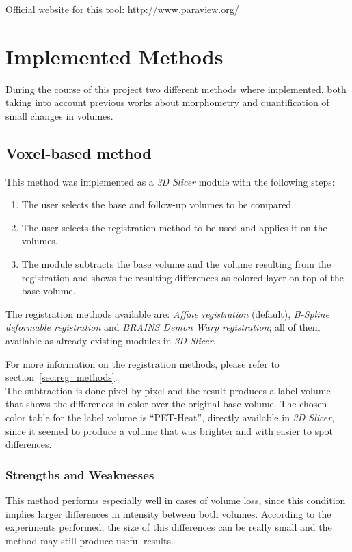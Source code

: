 Official website for this tool: \url{http://www.paraview.org/}

\section{Implemented Methods}
During the course of this project two different methods where
implemented, both taking into account previous works about morphometry
and quantification of small changes in volumes.

\subsection{Voxel-based method}
This method was implemented as a \textit{3D Slicer} module with the following steps:
\begin{enumerate}
\item The user selects the base and follow-up volumes to be compared.
\item The user selects the registration method to be used and applies it on the volumes.
\item The module subtracts the base volume and the volume resulting
  from the registration and shows the resulting differences as colored
  layer on top of the base volume.
\end{enumerate}

The registration methods available are: \textit{Affine registration}
(default), \textit{B-Spline deformable registration} and
\textit{BRAINS Demon Warp registration}; all of them available as
already existing modules in \textit{3D Slicer}.

For more information on the registration methods, please refer to
section~\ref{sec:reg_methods}.\\

The subtraction is done pixel-by-pixel and the result produces a label
volume that shows the differences in color over the original base
volume. The chosen color table for the label volume is ``PET-Heat'',
directly available in \textit{3D Slicer}, since it seemed to produce a
volume that was brighter and with easier to spot differences.

\subsubsection{Strengths and Weaknesses}
This method performs especially well in cases of volume loss, since
this condition implies larger differences in intensity between both
volumes. According to the experiments performed, the size of this
differences can be really small and the method may still produce
useful results.\\

